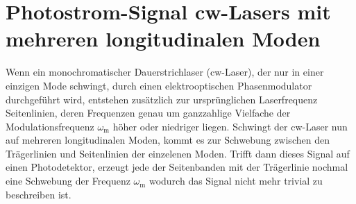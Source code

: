 
\newpage

\section{Photostrom-Signal cw-Lasers mit mehreren longitudinalen Moden}
\label{sec:cwlaser}


Wenn ein monochromatischer Dauerstrichlaser (cw-Laser), der nur in einer einzigen Mode schwingt, durch einen elektrooptischen Phasenmodulator durchgeführt wird, entstehen zusätzlich zur ursprünglichen Laserfrequenz Seitenlinien, deren Frequenzen genau um ganzzahlige Vielfache der Modulationsfrequenz $\omega_\mathrm{m}$ höher oder niedriger liegen. \cite{anleitung}
Schwingt der cw-Laser nun auf mehreren longitudinalen Moden, kommt es zur Schwebung zwischen den Trägerlinien und Seitenlinien der einzelenen Moden. Trifft dann dieses Signal auf einen Photodetektor, erzeugt jede der Seitenbanden mit der Trägerlinie nochmal eine Schwebung der Frequenz $\omega_\mathrm{m}$ wodurch das Signal nicht mehr trivial zu beschreiben ist.